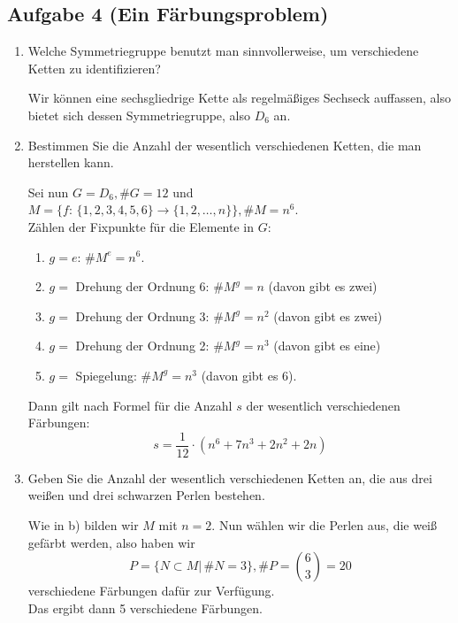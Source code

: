 \documentclass[11pt,a4paper,ngerman]{article}
\begin{document}
\subsection*{Aufgabe 4 \mdseries (Ein Färbungsproblem)}
\begin{enumerate}[\bfseries a)]
\item Welche Symmetriegruppe benutzt man sinnvollerweise, um verschiedene Ketten zu identifizieren?

Wir können eine sechsgliedrige Kette als regelmäßiges Sechseck auffassen, also bietet sich dessen Symmetriegruppe, also $D_6$ an.

\item Bestimmen Sie die Anzahl der wesentlich verschiedenen Ketten, die man herstellen kann.

Sei nun $G = D_6, \#G = 12$ und $M = \{f: \, \{1,2,3,4,5,6 \} \to \{1,2, \ldots , n \}\}, \#M = n^6$.\\
Zählen der Fixpunkte für die Elemente in $G$:
\begin{enumerate}[\bfseries i)]
\item $g = e$: $\#M^e = n^6$.
\item $g =$ Drehung der Ordnung 6: $\#M^g = n$ (davon gibt es zwei)
\item $g =$ Drehung der Ordnung 3: $\#M^g = n^2$ (davon gibt es zwei)
\item $g =$ Drehung der Ordnung 2: $\#M^g = n^3$ (davon gibt es eine)
\item $g =$ Spiegelung: $\#M^g = n^3$ (davon gibt es 6).
\end{enumerate}
Dann gilt nach Formel für die Anzahl $s$ der wesentlich verschiedenen Färbungen: \\
$$ s = \frac{1}{12} \cdot (n^6 + 7n^3 + 2n^2 + 2n)$$

\item Geben Sie die Anzahl der wesentlich verschiedenen Ketten an, die aus drei weißen und drei schwarzen Perlen bestehen.

Wie in b) bilden wir $M$ mit $n=2$. Nun wählen wir die Perlen aus, die weiß gefärbt werden, also haben wir 
$$ P = \{ N \subset M | \, \#N = 3 \}, \#P = \binom{6}{3} = 20 $$
verschiedene Färbungen dafür zur Verfügung.\\
Das ergibt dann 5 verschiedene Färbungen.
\end{enumerate}
\label{LastPage}
\end{document}
